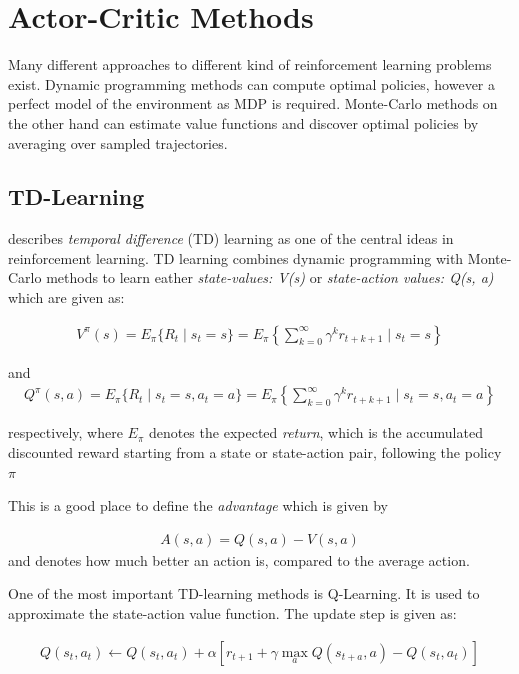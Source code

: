 \section{Actor-Critic Methods}
\raggedbottom 
Many different approaches to different kind of reinforcement learning problems exist. 
Dynamic programming methods can compute optimal policies, however a perfect model of the environment as MDP is required.
Monte-Carlo methods on the other hand can estimate value functions and discover optimal policies by averaging over sampled trajectories.

\subsection{TD-Learning}

\cite{Sut98} describes \textit{temporal difference} (TD) learning as one of the central ideas in reinforcement learning.
TD learning combines dynamic programming with Monte-Carlo methods to learn eather \textit{state-values: V(s)} or \textit{state-action values: Q(s, a)} which are given as:

\begin{align}
{
V^\pi (s) = E_\pi \{R_t \mid s_t = s\} = E_\pi \left\{ \sum_{k=0}^\infty \gamma^k r_{t+k+1} \mid s_t = s \right\}
}
\end{align}

and
\begin{align}
{
Q^\pi (s,a) = E_\pi \{R_t \mid s_t = s, a_t = a\} = E_\pi \left\{ \sum_{k=0}^\infty \gamma^k r_{t+k+1} \mid s_t = s, a_t = a \right\}
}
\end{align}

respectively, where \textit{$E_{\pi}$} denotes the expected \textit{return}, which is the accumulated discounted reward starting from a state or state-action pair, following the policy $\pi$

This is a good place to define the \textit{advantage} which is given by

\begin{align}
A(s,a) = Q(s,a)-V(s,a)
\end{align}
and denotes how much better an action is, compared to the average action.

One of the most important TD-learning methods is Q-Learning. 
It is used to approximate the state-action value function. The update step is given as:

\begin{align}
Q(s_t,a_t)\gets Q(s_t,a_t)+ \alpha [r_{t+1} + \gamma \max_a Q(s_{t+a},a)-Q(s_t,a_t)]
\end{align}

